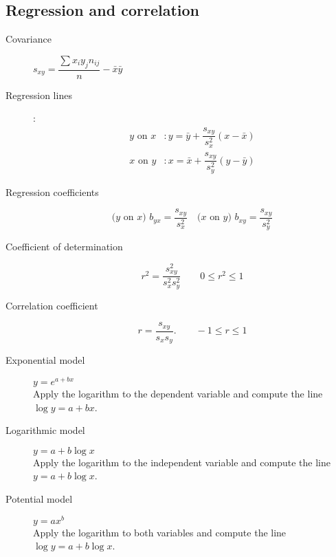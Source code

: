 \begin{multicols*}{2}
\subsection*{Regression and correlation}

\begin{tcolorbox}[hbox, title=Linear regression]
\begin{minipage}{0.4\textwidth}
\begin{description}
\item [Covariance] $s_{xy}=\dfrac{\sum x_iy_jn_{ij}}{n}-\bar{x}\bar{y}$
\item [Regression lines]:
      \begin{align*}
      \mbox{$y$ on $x$} & : y=\bar{y}+\dfrac{s_{xy}}{s_x^2}(x-\bar{x}) \\
      \mbox{$x$ on $y$} & : x=\bar{x}+\dfrac{s_{xy}}{s_y^2}(y-\bar{y})
      \end{align*}
\item [Regression coefficients]
      \[
      \mbox{($y$ on $x$) } b_{yx}=\dfrac{s_{xy}}{s_x^2}\quad \mbox{($x$ on
      $y$) } b_{xy}=\dfrac{s_{xy}}{s_y^2}
      \]
\item[Coefficient of determination]
      \[r^2=\dfrac{s_{xy}^2}{s_x^2s_y^2} \qquad 0\leq r^2\leq 1\]
\item[Correlation coefficient]
      \[r=\dfrac{s_{xy}}{s_xs_y}.\qquad -1\leq r\leq 1\]
\end{description}
\end{minipage}
\end{tcolorbox}

\medskip

\begin{tcolorbox}[hbox, title=Non-linear regression]
\begin{minipage}{0.4\textwidth}
\begin{description}
\item[Exponential model] $y=e^{a+bx}$\\
      Apply the logarithm to the dependent variable and compute the line $\log y = a+bx$.
\item[Logarithmic model] $y=a+b\log x$\\
      Apply the logarithm to the independent variable and compute the line $y=a+b\log x$.
\item[Potential model] $y=ax^b$\\
      Apply the logarithm to both variables and compute the line $\log y = a+b\log x$.
\end{description}
\end{minipage}
\end{tcolorbox}


\end{multicols*}
